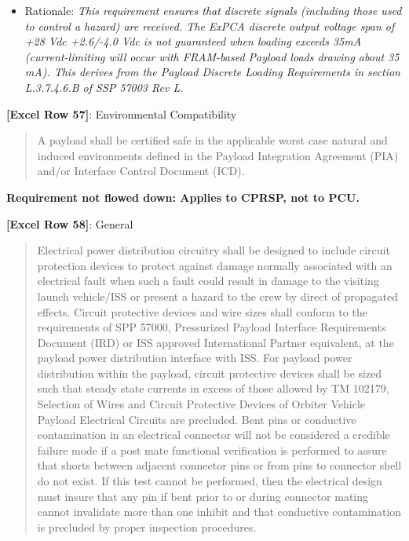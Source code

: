 \begin{itemize}
\item{} Rationale: \emph{This requirement ensures that discrete signals (including those used to control a hazard) are received. The ExPCA discrete output voltage span of +28 Vdc +2.6\slash -4.0 Vdc is not guaranteed when loading exceeds 35mA (current-limiting will occur with FRAM-based Payload loads drawing about 35 mA). This derives from the Payload Discrete Loading Requirements in section L.3.7.4.6.B of SSP 57003 Rev L.}

\end{itemize}

\textbf{[Excel Row 57]}: Environmental Compatibility

\begin{quote}
A payload shall be certified safe in the applicable worst case natural and induced environments defined in the Payload Integration Agreement (PIA) and\slash or Interface Control Document (ICD).
\end{quote}

\textbf{Requirement not flowed down: Applies to CPRSP, not to PCU.}

\textbf{[Excel Row 58]}: General

\begin{quote}
Electrical power distribution circuitry shall be designed to include circuit protection devices to protect against damage normally associated with an electrical fault when such a fault could result in damage to the visiting launch vehicle\slash ISS or present a hazard to the crew by direct of propagated effects. Circuit protective devices and wire sizes shall conform to the requirements of SPP 57000, Pressurized Payload Interface Requirements Document (IRD) or ISS approved International Partner equivalent, at the payload power distribution interface with ISS. For payload power distribution within the payload, circuit protective devices shall be sized such that steady state currents in excess of those allowed by TM 102179, Selection of Wires and Circuit Protective Devices of Orbiter Vehicle Payload Electrical Circuits are precluded. Bent pins or conductive contamination in an electrical connector will not be considered a credible failure mode if a post mate functional verification is performed to assure that shorts between adjacent connector pins or from pins to connector shell do not exist. If this test cannot be performed, then the electrical design must insure that any pin if bent prior to or during connector mating cannot invalidate more than one inhibit and that conductive contamination is precluded by proper inspection procedures.
\end{quote}

